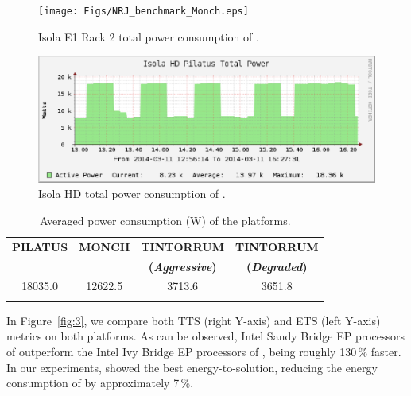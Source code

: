 \begin{figure}[ht]
  \centering
  \texttt{[image: Figs/NRJ\_benchmark\_Monch.eps]}
  \caption{Isola E1 Rack 2 total power consumption of \monch.}
  \label{fig:1}
\end{figure}

\begin{figure}[ht]
  \centering
  \includegraphics[width=1\columnwidth]{Figs/NRJ_benchmark_Pilatus.eps}
  \caption{Isola HD total power consumption of \pilat.}
  \label{fig:2}
\end{figure}

\begin{table}[ht]
  \centering
  \caption{Averaged power consumption (W) of the platforms.}
  \label{tab:1}
  \begin{tabular}{cccc}
    \hline\noalign{\smallskip}     \textbf{\scriptsize{PILATUS}}     &
    \textbf{\scriptsize{MONCH}}  &  \textbf{\scriptsize{TINTORRUM}}  &
    \textbf{\scriptsize{TINTORRUM}}           \\          &          &
    \textbf{\scriptsize{(\emph{Aggressive})}} & \textbf{\scriptsize{(\emph{Degraded})}}
    \\    \noalign{\smallskip}\hline\noalign{\smallskip}   18035.0   &
    12622.5 & 3713.6 & 3651.8 \\ \noalign{\smallskip}\hline
  \end{tabular}
\end{table}

In  Figure~\ref{fig:3}, we  compare both  TTS (right  Y-axis)  and ETS
(left  Y-axis)  metrics  on  both  platforms.  As can be observed, Intel Sandy Bridge EP processors of \pilat
outperform the Intel Ivy  Bridge EP processors of \monch, being roughly 130\,\%  faster. 
In  our experiments,  \monch  showed  the  best  energy-to-solution,
reducing the energy consumption of \pilat by approximately 7\,\%.

